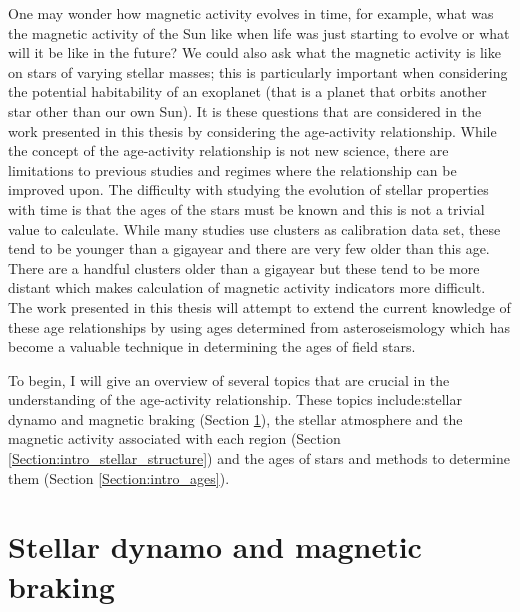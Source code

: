 One may wonder how magnetic activity evolves in time, for example, what was the magnetic activity of the Sun like when life was just starting to evolve or what will it be like in the future? We could also ask what the magnetic activity is like on stars of varying stellar masses; this is particularly important when considering the potential habitability of an exoplanet (that is a planet that orbits another star other than our own Sun). It is these questions that are considered in the work presented in this thesis by considering the age-activity relationship. While the concept of the age-activity relationship is not new science, there are limitations to previous studies and regimes where the relationship can be improved upon. The difficulty with studying the evolution of stellar properties with time is that the ages of the stars must be known and this is not a trivial value to calculate. While many studies use clusters as calibration data set, these tend to be younger than a gigayear and there are very few older than this age. There are a handful clusters older than a gigayear but these tend to be more distant which makes calculation of magnetic activity indicators more difficult. The work presented in this thesis will attempt to extend the current knowledge of these age relationships by using ages determined from asteroseismology which has become a valuable technique in determining the ages of field stars.

To begin, I will give an overview of several topics that are crucial in the understanding of the age-activity relationship. These topics include:stellar dynamo and magnetic braking (Section \ref{Section:intro_dynamo_and_braking_section}), the stellar atmosphere and the magnetic activity associated with each region (Section \ref{Section:intro_stellar_structure}) and the ages of stars and methods to determine them (Section \ref{Section:intro_ages}).

\section{Stellar dynamo and magnetic braking}
\label{Section:intro_dynamo_and_braking_section}

